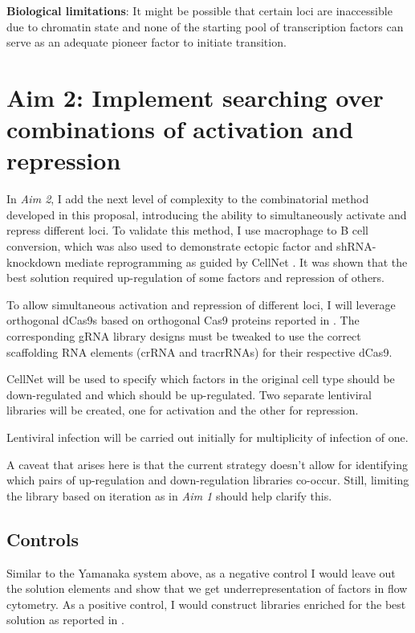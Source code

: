 \documentclass[10pt]{article}
\begin{document}
\noindent \textbf{Biological limitations}: It might be possible that certain loci are inaccessible due to chromatin state and none of the starting pool of transcription factors can serve as an adequate pioneer factor to initiate transition.

\section{Aim 2: Implement searching over combinations of activation and repression}

In \textit{Aim 2}, I add the next level of complexity to the combinatorial method developed in this proposal, introducing the ability to simultaneously activate and repress different loci. To validate this method, I use macrophage to B cell conversion, which was also used to demonstrate ectopic factor and shRNA-knockdown mediate reprogramming as guided by CellNet \cite{morris2014dissecting}. It was shown that the best solution required up-regulation of some factors and repression of others.

To allow simultaneous activation and repression of different loci, I will leverage orthogonal dCas9s based on orthogonal Cas9 proteins reported in \cite{esvelt2013orthogonal}. The corresponding gRNA library designs must be tweaked to use the correct scaffolding RNA elements (crRNA and tracrRNAs) for their respective dCas9.

CellNet will be used to specify which factors in the original cell type should be down-regulated and which should be up-regulated. Two separate lentiviral libraries will be created, one for activation and the other for repression.

Lentiviral infection will be carried out initially for multiplicity of infection of one.

A caveat that arises here is that the current strategy doesn't allow for identifying which pairs of up-regulation and down-regulation libraries co-occur. Still, limiting the library based on iteration as in \textit{Aim 1} should help clarify this.

\subsection{Controls}

Similar to the Yamanaka system above, as a negative control I would leave out the solution elements and show that we get underrepresentation of factors in flow cytometry. As a positive control, I would construct libraries enriched for the best solution as reported in \cite{morris2014dissecting}.
\end{document}
